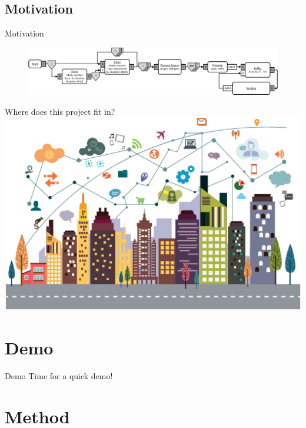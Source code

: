 \documentclass{beamer}
\begin{document}
\subsection{Motivation}
\begin{frame}{Motivation}
	\begin{figure}
 		\includegraphics[width=\linewidth]{pure_aloha.png}
 		\label{fig:aloha}
	\end{figure}
\end{frame}

\begin{frame}{Where does this project fit in?}
	\includegraphics[width=\linewidth]{digital.eps}
\end{frame}

\section{Demo}
\begin{frame}{Demo}
Time for a quick demo!
\end{frame}

\section{Method}
\end{document}
